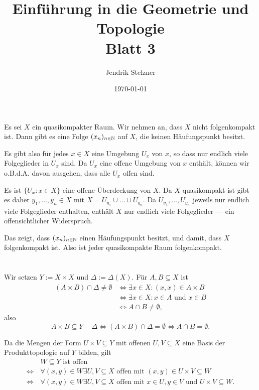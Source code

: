 \documentclass[a4paper,10pt]{article}
\title{\sc Einführung in die Geometrie und Topologie \\ \Large Blatt 3}
\author{Jendrik Stelzner}
\date{\today}
\begin{document}
\maketitle





\section{}
Es sei $X$ ein quasikompakter Raum. Wir nehmen an, dass $X$ nicht folgenkompakt ist. Dann gibt es eine Folge $(x_n)_{n \in \mathbb{N}}$ auf $X$, die keinen Häufungspunkt besitzt.

Es gibt also für jedes $x \in X$ eine Umgebung $U_x$ von $x$, so dass nur endlich viele Folgeglieder in $U_x$ sind. Da $U_x$ eine offene Umgebung von $x$ enthält, können wir o.B.d.A. davon ausgehen, dass alle $U_x$ offen sind.

Es ist $\{U_x : x \in X\}$ eine offene Überdeckung von $X$. Da $X$ quasikompakt ist gibt es daher $y_1, \ldots, y_n \in X$ mit $X = U_{y_1} \cup \ldots \cup U_{y_n}$. Da $U_{y_1}, \ldots, U_{y_n}$ jeweils nur endlich viele Folgeglieder enthalten, enthält $X$ nur endlich viele Folgeglieder — ein offensichtlicher Widerspruch.

Das zeigt, dass $(x_n)_{n \in \mathbb{N}}$ einen Häufungspunkt besitzt, und damit, dass $X$ folgenkompakt ist. Also ist jeder quasikompakte Raum folgenkompakt.





\section{}
Wir setzen $Y := X \times X$ und $\Delta := \Delta(X)$. Für $A,B \subseteq X$ ist
\begin{align*}
                  (A \times B) \cap \Delta \neq \emptyset
 &\Leftrightarrow \exists x \in X : (x,x) \in A \times B \\
 &\Leftrightarrow \exists x \in X : x \in A \text{ und } x \in B \\
 &\Leftrightarrow A \cap B \neq \emptyset,
\end{align*}
also
\[
 A \times B \subseteq Y-\Delta
 \Leftrightarrow (A \times B) \cap \Delta = \emptyset
 \Leftrightarrow A \cap B = \emptyset.
\]

Da die Mengen der Form $U \times V \subseteq Y$ mit offenen $U, V \subseteq X$ eine Basis der Produkttopologie auf $Y$ bilden, gilt
\begin{align*}
                &\, W \subseteq Y \text{ ist offen} \\
 \Leftrightarrow&\, \forall (x,y) \in W \exists U,V \subseteq X \text{ offen mit } (x,y) \in U \times V \subseteq W \\
 \Leftrightarrow&\, \forall (x,y) \in W \exists U,V \subseteq X \text{ offen mit } x \in U, y \in V \text{ und } U \times V \subseteq W.
\end{align*}
\end{document}
